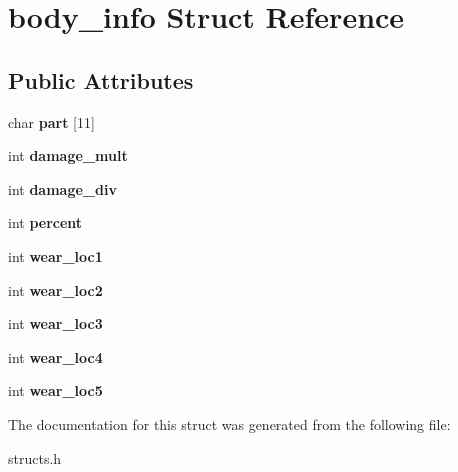 \hypertarget{structbody__info}{\section{body\-\_\-info Struct Reference}
\label{structbody__info}
}
\subsection*{Public Attributes}
\begin{DoxyCompactItemize}
\item 
\hypertarget{structbody__info_a9d4ecf947592ededfe1a36b502fc78bb}{char {\bfseries part} \mbox{[}11\mbox{]}}\label{structbody__info_a9d4ecf947592ededfe1a36b502fc78bb}

\item 
\hypertarget{structbody__info_a48f0f282718fa5719f638768c17bcebf}{int {\bfseries damage\-\_\-mult}}\label{structbody__info_a48f0f282718fa5719f638768c17bcebf}

\item 
\hypertarget{structbody__info_a48e556b563871623678fe8f73eda943b}{int {\bfseries damage\-\_\-div}}\label{structbody__info_a48e556b563871623678fe8f73eda943b}

\item 
\hypertarget{structbody__info_ad73b391a0e0de991e6e2b7e1c5bce50c}{int {\bfseries percent}}\label{structbody__info_ad73b391a0e0de991e6e2b7e1c5bce50c}

\item 
\hypertarget{structbody__info_aca020bc5a0f3b41c37ff6ac4644f533a}{int {\bfseries wear\-\_\-loc1}}\label{structbody__info_aca020bc5a0f3b41c37ff6ac4644f533a}

\item 
\hypertarget{structbody__info_a2adaf5d796aa8e451419cd12683fc132}{int {\bfseries wear\-\_\-loc2}}\label{structbody__info_a2adaf5d796aa8e451419cd12683fc132}

\item 
\hypertarget{structbody__info_a6f96748380df84a15cdd7a7b63c5b01f}{int {\bfseries wear\-\_\-loc3}}\label{structbody__info_a6f96748380df84a15cdd7a7b63c5b01f}

\item 
\hypertarget{structbody__info_a64a5172067829d0ce05afa46e84e8a18}{int {\bfseries wear\-\_\-loc4}}\label{structbody__info_a64a5172067829d0ce05afa46e84e8a18}

\item 
\hypertarget{structbody__info_acd7eadf994811223deae1fcb6d655bf8}{int {\bfseries wear\-\_\-loc5}}\label{structbody__info_acd7eadf994811223deae1fcb6d655bf8}

\end{DoxyCompactItemize}


The documentation for this struct was generated from the following file\-:\begin{DoxyCompactItemize}
\item 
structs.\-h\end{DoxyCompactItemize}
